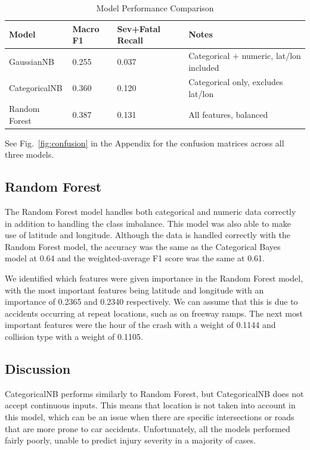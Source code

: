 \documentclass[conference]{IEEEtran}
\begin{document}
\begin{table}[H]
  \centering
  \caption{Model Performance Comparison}
  \label{tab:results}
  \begin{tabular}{@{}lllp{2cm}@{}}
    \toprule
    Model & Macro F1 & Sev+Fatal Recall & Notes \\
    \midrule
    GaussianNB & 0.255 & 0.037 & Categorical + numeric, lat/lon included \\
    CategoricalNB & 0.360 & 0.120 & Categorical only, excludes lat/lon \\
    Random Forest & 0.387 & 0.131 & All features, balanced \\
    \bottomrule
  \end{tabular}
\end{table}

See Fig.~\ref{fig:confusion} in the Appendix for the confusion matrices across all three models.

\subsection{Random Forest}

The Random Forest model handles both categorical and numeric data correctly in addition to handling the class imbalance. This model was also able to make use of latitude and longitude. Although the data is handled correctly with the Random Forest model, the accuracy was the same as the Categorical Bayes model at 0.64 and the weighted-average F1 score was the same at 0.61.

We identified which features were given importance in the Random Forest model, with the most important features being latitude and longitude with an importance of 0.2365 and 0.2340 respectively. We can assume that this is due to accidents occurring at repeat locations, such as on freeway ramps. The next most important features were the hour of the crash with a weight of 0.1144 and collision type with a weight of 0.1105.

\subsection{Discussion}

CategoricalNB performs similarly to Random Forest, but CategoricalNB does not accept continuous inputs. This means that location is not taken into account in this model, which can be an issue when there are specific intersections or roads that are more prone to car accidents. Unfortunately, all the models performed fairly poorly, unable to predict injury severity in a majority of cases.
\end{document}
